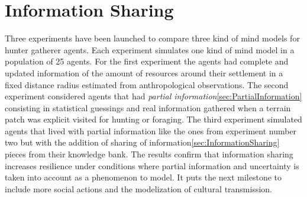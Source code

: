 \documentclass[11pt,oneside,a4paper,openright]{report}
\begin{document}












\section{Information Sharing}
\label{sec:ExperInfoSharing}

Three experiments have been launched to compare three kind of mind models for hunter gatherer agents. Each experiment simulates one kind of mind model in a population of 25 agents. For the first experiment the agents had complete and updated information of the amount of resources around their settlement in a fixed distance radius estimated from anthropological observations. The second experiment considered agents that had \emph{partial information}\ref{sec:PartialInformation} consisting in statistical guessings and real information gathered when a terrain patch was explicit visited for hunting or foraging. The third experiment simulated agents that lived with partial information like the ones from experiment number two but with the addition of sharing of information\ref{sec:InformationSharing} pieces from their knowledge bank. The results confirm that information sharing increases resilience under conditions where partial information and uncertainty is taken into account as a phenomenon to model. It puts the next milestone to include more social actions and the modelization of cultural transmission.
\end{document}
